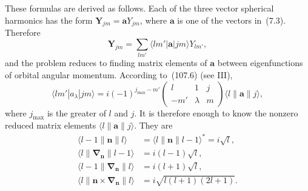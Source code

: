 These formulas are derived as follows. Each of the three vector spherical harmonics has the form $\mathbf Y_{jm}=\mathbf aY_{jm}$, where $\mathbf a$ is one of the vectors in~(7.3). Therefore
\[
\mathbf Y_{jm}=\sum_{lm'}\langle lm'|\mathbf a|jm\rangle Y_{lm'},
\]
and the problem reduces to finding matrix elements of $\mathbf a$ between eigenfunctions of orbital angular momentum. According to~(107.6) (see III),
\[
\langle lm'|a_\lambda|jm\rangle
=i(-1)^{j_{\max}-m'}
\begin{pmatrix}l&1&j\\-m'&\lambda&m\end{pmatrix}
\langle l\|\mathbf a\|j\rangle,
\]
\noindent
where $j_{\max}$ is the greater of $l$ and $j$. It is therefore enough to know the nonzero reduced matrix elements $\langle l\|\mathbf a\|j\rangle$. They are
\begin{equation}
\begin{aligned}
\langle l-1\|\mathbf n\|l\rangle
&=\langle l\|\mathbf n\|l-1\rangle^*=i\sqrt l,\\
\langle l\|\boldsymbol\nabla_{\mathbf n}\|l-1\rangle
&=i(l-1)\sqrt l,\\
\langle l-1\|\boldsymbol\nabla_{\mathbf n}\|l\rangle
&=i(l+1)\sqrt l,\\
\langle l\|\mathbf n\times\boldsymbol\nabla_{\mathbf n}\|l\rangle
&=i\sqrt{l(l+1)(2l+1)}.
\end{aligned}
\tag{7.17}
\end{equation}
